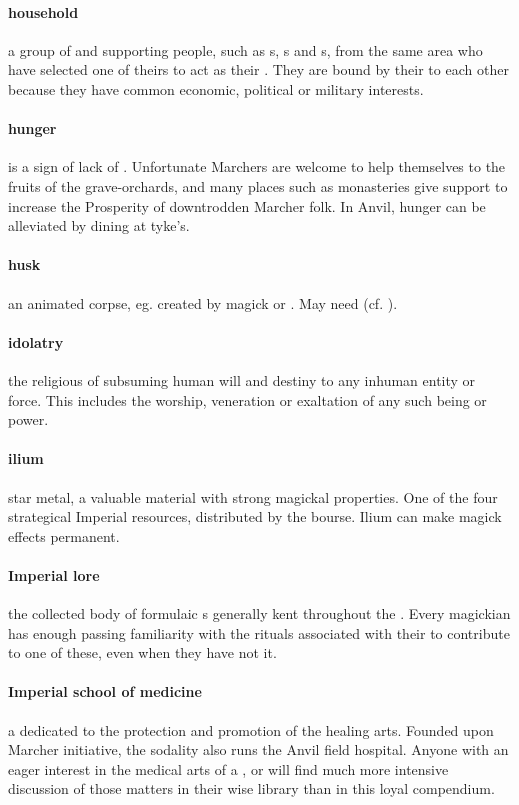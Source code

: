 \paragraph{household} a group of  and supporting people, such as s, s and s, from the same area who have selected one of theirs to act as their . They are bound by their  to each other because they have common economic, political or military interests.
\paragraph{hunger} is a sign of lack of . Unfortunate Marchers are welcome to help themselves to the fruits of the grave-orchards, and many places such as monasteries give support to increase the Prosperity of downtrodden Marcher folk. In Anvil, hunger can be alleviated by dining at tyke’s.
\paragraph{husk} an animated corpse, eg. created by  magick or . May need  (cf. ).
\paragraph{idolatry}the religious  of subsuming human will and destiny to any inhuman entity or force. This includes the worship, veneration or exaltation of any such being or power.
\paragraph{ilium} star metal, a valuable material with strong magickal properties. One of the four strategical Imperial resources, distributed by the bourse. Ilium can make magick effects permanent.
\paragraph{Imperial lore} the collected body of formulaic s generally kent throughout the . Every magickian has enough passing familiarity with the rituals associated with their  to contribute to one of these, even when they have not  it.
\paragraph{Imperial school of medicine} a  dedicated to the protection and promotion of the healing arts. Founded upon Marcher initiative, the sodality also runs the Anvil field hospital. Anyone with an eager interest in the medical arts of a ,  or  will find much more intensive discussion of those matters in their wise library than in this loyal compendium.
